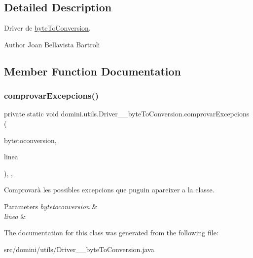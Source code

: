 \subsection{Detailed Description}
Driver de \hyperlink{classdomini_1_1utils_1_1byteToConversion}{byte\+To\+Conversion}. 

\begin{DoxyAuthor}{Author}
Joan Bellavista Bartroli 
\end{DoxyAuthor}


\subsection{Member Function Documentation}
\mbox{\label{classdomini_1_1utils_1_1Driver____byteToConversion_a82c589da57bedb139b9254c8623a7fd4}} 
\subsubsection{\texorpdfstring{comprovar\+Excepcions()}{comprovarExcepcions()}}
{\footnotesize\ttfamily private static void domini.\+utils.\+Driver\+\_\+\+\_\+byte\+To\+Conversion.\+comprovar\+Excepcions (\begin{DoxyParamCaption}\item[{\hyperlink{classdomini_1_1utils_1_1byteToConversion}{byte\+To\+Conversion}}]{bytetoconversion,  }\item[{String}]{linea }\end{DoxyParamCaption})\hspace{0.3cm}{\ttfamily [inline]}, {\ttfamily [static]}, {\ttfamily [private]}}



Comprovarà les possibles excepcions que puguin apareixer a la classe. 


\begin{DoxyParams}{Parameters}
{\em bytetoconversion} & \\
\hline
{\em linea} & \\
\hline
\end{DoxyParams}


The documentation for this class was generated from the following file\+:\begin{DoxyCompactItemize}
\item 
src/domini/utils/Driver\+\_\+\+\_\+byte\+To\+Conversion.\+java\end{DoxyCompactItemize}

